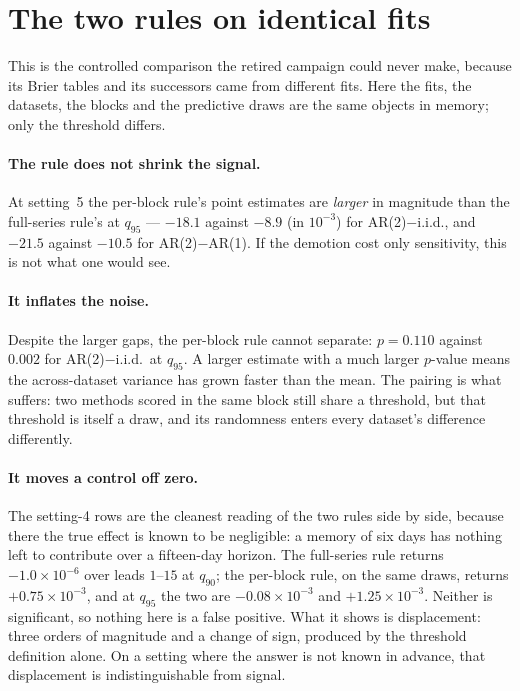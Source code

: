 \documentclass[11pt]{article}
\newcommand{\tblpath}{../../code/analysis/time_block_forecast/simstudy/output/tables}
\newcommand{\tbl}[1]{}
\begin{document}
\section{The two rules on identical fits}
\label{sec:contrast}

\tbl{expA_rulecontrast}

\noindent This is the controlled comparison the retired campaign could
never make, because its Brier tables and its successors came from
different fits. Here the fits, the datasets, the blocks and the
predictive draws are the same objects in memory; only the threshold
differs.

\paragraph{The rule does not shrink the signal.} At setting~5 the
per-block rule's point estimates are \emph{larger} in magnitude than the
full-series rule's at $q_{95}$ --- $-18.1$ against $-8.9$ (in $10^{-3}$)
for AR(2)$-$i.i.d., and $-21.5$ against $-10.5$ for AR(2)$-$AR(1). If
the demotion cost only sensitivity, this is not what one would see.

\paragraph{It inflates the noise.} Despite the larger gaps, the
per-block rule cannot separate: $p = 0.110$ against $0.002$ for
AR(2)$-$i.i.d.\ at $q_{95}$. A larger estimate with a much larger
$p$-value means the across-dataset variance has grown faster than the
mean. The pairing is what suffers: two methods scored in the same block
still share a threshold, but that threshold is itself a draw, and its
randomness enters every dataset's difference differently.

\paragraph{It moves a control off zero.} The setting-4 rows are the
cleanest reading of the two rules side by side, because there the true
effect is known to be negligible: a memory of six days has nothing left
to contribute over a fifteen-day horizon. The full-series rule returns
$-1.0 \times 10^{-6}$ over leads $1$--$15$ at $q_{90}$; the per-block
rule, on the same draws, returns $+0.75 \times 10^{-3}$, and at $q_{95}$
the two are $-0.08 \times 10^{-3}$ and $+1.25 \times 10^{-3}$. Neither
is significant, so nothing here is a false positive. What it shows is
displacement: three orders of magnitude and a change of sign, produced by
the threshold definition alone. On a setting where the answer is not
known in advance, that displacement is indistinguishable from signal.
\end{document}
